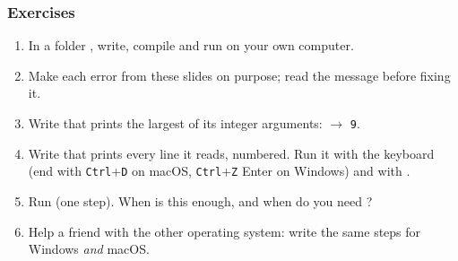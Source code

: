 \documentclass[aspectratio=169,10pt,compress]{beamer}
\begin{document}
\begin{frame}[t,fragile] \frametitle{Exercises}
  \begin{enumerate}\small
    \item In a folder , write, compile and run  on your own computer.
    \item Make each error from these slides on purpose; read the message before fixing it.
    \item Write  that prints the largest of its integer arguments:  $\to$ \texttt{9}.
    \item Write  that prints every line it reads, numbered. Run it with the keyboard
          (end with \texttt{Ctrl}+\texttt{D} on macOS, \texttt{Ctrl}+\texttt{Z} Enter on Windows) and with .
    \item Run  (one step). When is this enough, and when do you need ?
    \item Help a friend with the other operating system: write the same steps for Windows \emph{and} macOS.
  \end{enumerate}
\end{frame}




\begin{frame}[t,fragile]
	\begin{center}
		\vspace{4cm}
	\end{center}
\end{frame}
\end{document}
